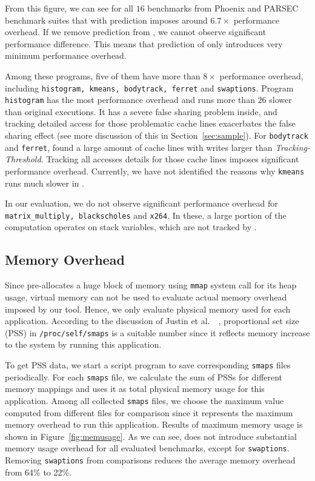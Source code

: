From this figure, we can see for all $16$ benchmarks from Phoenix and PARSEC
benchmark suites that \Predator{} with prediction imposes around $6.7\times$
performance overhead. 
If we remove prediction from \Predator{}, we cannot observe significant performance difference.
This means that prediction of \Predator{} only introduces very minimum performance overhead. 

Among these programs, five of them have more than $8\times$ performance overhead, 
including \texttt{histogram, kmeans, bodytrack, ferret} and \texttt{swaptions}. 
Program \texttt{histogram} has the most performance overhead and 
runs more than $26$ slower than original executions. 
It has a severe false sharing problem inside, and tracking detailed access for those
problematic cache lines exacerbates the 
false sharing effect (see more discussion of this in Section~\ref{sec:sample}). 
For \texttt{bodytrack} and \texttt{ferret}, \Predator{} found a large amount of cache lines with 
writes larger than {\it Tracking-Threshold}. 
Tracking all accesses details for those cache lines 
imposes significant performance overhead. 
Currently, we have not identified the reasons 
why \texttt{kmeans} runs much slower in \Predator{}.   

In our evaluation, we do not observe significant performance overhead for
\texttt{matrix\_multiply, blackscholes} and 
\texttt{x264}.
In these, a large portion of the computation operates on stack variables, which are
not tracked by \Predator{}. 


\subsection{Memory Overhead}
\label{sec:memoverhead}
Since \Predator{} pre-allocates a huge block of memory
using \texttt{mmap} system call for its heap usage, 
virtual memory can not be used to evaluate actual memory overhead imposed by our tool. 
Hence, we only evaluate physical memory used for each application. 
According to the discussion of Justin et al.\ ~\cite{memusage}, proportional set size (PSS) 
in \texttt{/proc/self/smaps} is a suitable number since it reflects memory increase to the system
by running this application. 

To get PSS data, we start a script program to save 
corresponding \texttt{smaps} files periodically.
For each \texttt{smaps} file, we calculate the sum of PSSs for different
memory mappings and uses it as total physical memory usage for this application.
Among all collected \texttt{smaps} files, we choose the maximum value computed from
different files for comparison 
since it represents the maximum memory overhead to run this application.
Results of maximum memory usage is shown in Figure~\ref{fig:memusage}. As we can see,
\Predator{} does not introduce substantial memory usage overhead 
for all evaluated benchmarks, except for \texttt{swaptions}. 
Removing \texttt{swaptions} from comparisons reduces 
the average memory overhead from 64\% to 22\%. 

